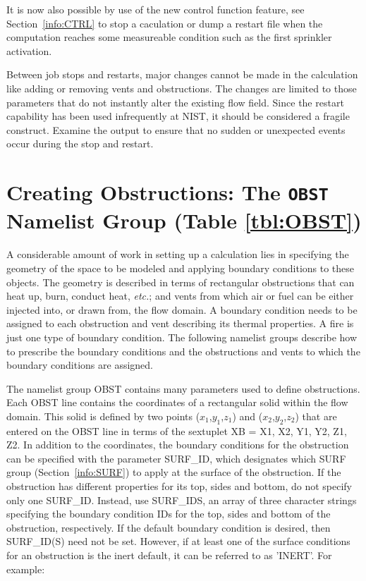 \documentclass[11pt]{book}
\begin{document}
It is now also possible by use of the new control function feature, see Section~\ref{info:CTRL}
to stop a caculation or dump a restart file when the computation reaches
some measureable condition such as the first sprinkler activation.


Between job stops and restarts, major changes cannot be made in the calculation
like adding or removing vents and obstructions. The changes are limited to those parameters that do
not instantly alter the existing flow field. Since the restart
capability has been used infrequently at NIST, it should be considered
a fragile construct. Examine the output
to ensure that no sudden or unexpected events occur during the stop and
restart.





\newpage

\section{Creating Obstructions: The \texorpdfstring{{\tt OBST}}{OBST} Namelist Group (Table \ref{tbl:OBST})}
\label{info:OBST}

A considerable amount of work in setting up a calculation lies in specifying the
geometry of the space to be modeled and applying boundary conditions
to these objects. The geometry is described in terms
of rectangular obstructions that can heat up, burn, conduct heat, {\em etc.};
and vents from which air or fuel can be
either injected into, or drawn from, the flow domain.
A boundary condition needs to be assigned to each obstruction
and vent describing its thermal properties. A fire is just one type of
boundary condition. The following
namelist groups describe how to prescribe the boundary conditions
and the obstructions and vents to which the boundary conditions are
assigned.

The namelist group {\ct OBST} contains many parameters used to define obstructions.
Each {\ct OBST} line contains the coordinates of a rectangular
solid within the flow domain. This solid is defined by two points
($x_1$,$y_1$,$z_1$) and ($x_2$,$y_2$,$z_2$) that are entered on the
{\ct OBST} line in terms of the sextuplet {\ct XB = X1, X2, Y1, Y2, Z1, Z2}.
In addition to the coordinates, the boundary conditions for the obstruction
can be specified with the parameter {\ct SURF\_ID}, which designates which
{\ct SURF} group (Section~\ref{info:SURF}) to apply at the surface of the obstruction.
If the obstruction has different properties for its top,
sides and bottom, do not specify only one {\ct SURF\_ID}. Instead, use {\ct SURF\_IDS}, an array of three character
strings specifying the boundary condition {\ct ID}s for the top,
sides and bottom of the obstruction, respectively.
If the default
boundary condition is desired, then {\ct SURF\_ID(S)} need not be set.
However, if at least one of the surface conditions for an
obstruction is the inert default, it can be referred to as {\ct 'INERT'}.
For example:
\end{document}

